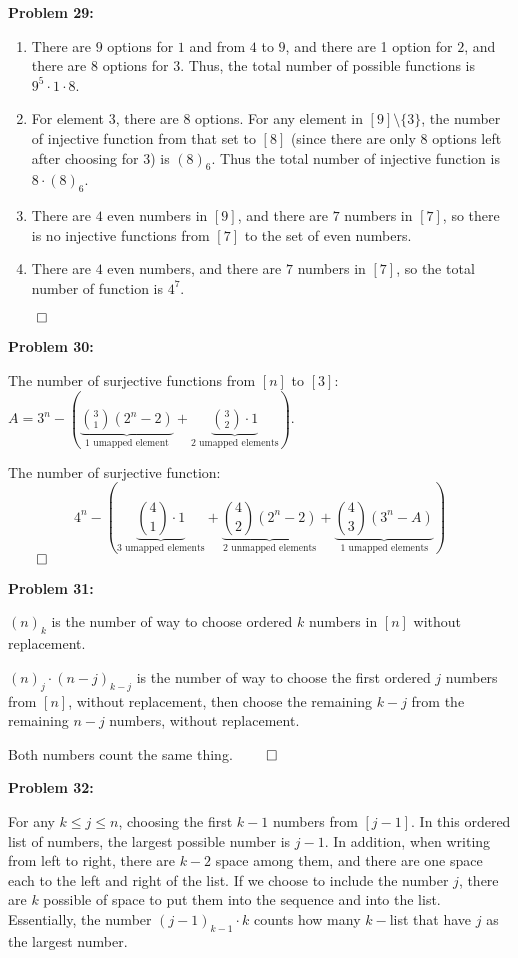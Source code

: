 \documentclass[12pt]{article}
\begin{document}
\textbf{Problem 29:}

\begin{enumerate}[label=(\alph*)]
	\item There are $9$ options for $1$ and from $4$ to $9$, and there are 1 option for $2$, and there are $8$ options for $3$. Thus, the total number of possible functions is $9^5 \cdot 1 \cdot 8$.
    \item For element $3$, there are $8$ options. For any element in $[9] \setminus \{3\}$, the number of injective function from that set to $[8]$ (since there are only $8$ options left after choosing for $3$) is $(8)_6$. Thus the total number of injective function is $8 \cdot (8)_6$.
    \item There are $4$ even numbers in $[9]$, and there are $7$ numbers in $[7]$, so there is no injective functions from $[7]$ to the set of even numbers.
    \item There are $4$ even numbers, and there are $7$ numbers in $[7]$, so the total number of function is $4^7$.
\end{enumerate} $\qed$

\textbf{Problem 30:}

The number of surjective functions from $[n]$ to $[3]$: $A = 3^n - (\underbrace{\binom{3}{1} (2^n-2)}_\text{$1$ umapped element} + \underbrace{\binom{3}{2} \cdot 1}_\text{$2$ umapped elements})$.

The number of surjective function: $$4^n - (\underbrace{\binom{4}{1} \cdot 1}_\text{$3$ umapped elements} + \underbrace{\binom{4}{2} (2^n-2)}_\text{$2$ unmapped elements} + \underbrace{\binom{4}{3} (3^n - A)}_\text{$1$ umapped elements})$$ $\qed$

\textbf{Problem 31:}

$(n)_k$ is the number of way to choose ordered $k$ numbers in $[n]$ without replacement.

$(n)_j \cdot (n-j)_{k-j}$ is the number of way to choose the first ordered $j$ numbers from $[n]$, without replacement, then choose the remaining $k-j$ from the remaining $n-j$ numbers, without replacement.

Both numbers count the same thing. $\qed$

\textbf{Problem 32:}

For any $k \le j \le n$, choosing the first $k-1$ numbers from $[j-1]$. In this ordered list of numbers, the largest possible number is $j-1$. In addition, when writing from left to right, there are $k-2$ space among them, and there are one space each to the left and right of the list. If we choose to include the number $j$, there are $k$ possible of space to put them into the sequence and into the list. Essentially, the number $(j-1)_{k-1} \cdot k$ counts how many $k-$list that have $j$ as the largest number.
\end{document}
